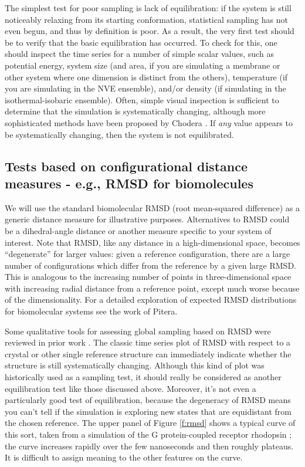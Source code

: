 The simplest test for poor sampling is lack of equilibration: if the system is still noticeably relaxing from its starting conformation, statistical sampling has not even begun, and thus by definition is poor.  As a result, the very first test should be to verify that the basic equilibration has occurred.  To check for this, one should inspect the time series for a number of simple scalar values, such as potential energy, system size (and area, if you are simulating a membrane or other system where one dimension is distinct from the others), temperature (if you are simulating in the NVE ensemble), and/or density (if simulating in the isothermal-isobaric ensemble).  Often, simple visual inspection is sufficient to determine that the simulation is systematically changing, although more sophisticated methods have been proposed by Chodera \cite{Chodera-2016}.  If \emph{any} value appears to be systematically changing, then the system is not equilibrated.

\subsection{Tests based on configurational distance measures - e.g., RMSD for biomolecules}
We will use the standard biomolecular RMSD (root mean-squared difference) as a generic distance measure for illustrative purposes.
Alternatives to RMSD could be a dihedral-angle distance or another measure specific to your system of interest.
Note that RMSD, like any distance in a high-dimensional space, becomes ``degenerate'' for larger values: given a reference configuration, there are a large number of configurations which differ from the reference by a given large RMSD. This is analogous to the increasing number of points in three-dimensional space with increasing radial distance from a reference point, except much worse because of the dimensionality. For a detailed exploration of expected RMSD distributions for biomolecular systems see the work of Pitera.\citep{Pitera2014}

Some qualitative tools for assessing global sampling based on RMSD were reviewed
in prior work \cite{Grossfield2009}.   The classic time series plot of RMSD with
respect to a crystal or other single reference structure can immediately
indicate whether the structure is still systematically changing.  Although this
kind of plot was historically used as a sampling test, it should really be
considered as another equilibration test like those discussed above.  Moreover,
it's not even a particularly good test of equilibration, because the degeneracy
of RMSD means you can't tell if the simulation is exploring new states that are
equidistant from the chosen reference.  The upper panel of Figure \ref{f:rmsd}
shows a typical curve of this sort, taken from a simulation of the G
protein-coupled receptor rhodopsin \cite{Grossfield-2015}; the curve increases
rapidly over the few nanoseconds and then roughly plateaus.  It is difficult to
assign meaning to the other features on the curve.

